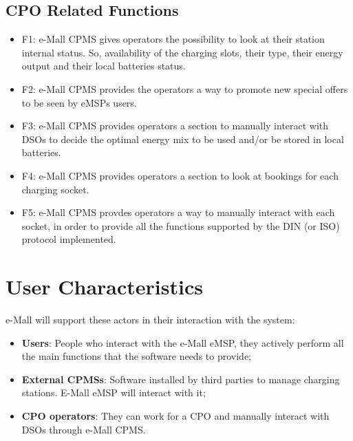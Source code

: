 \documentclass[12pt]{report}
\begin{document}
\subsection{CPO Related Functions}
\begin{itemize}
    \item F1: e-Mall CPMS gives operators the possibility to look at their station internal status. So, availability of the charging slots, their type, their energy output and their local batteries status.
    \item F2: e-Mall CPMS provides the operators a way to promote new special offers to be seen by eMSPs users.
    \item F3: e-Mall CPMS provides operators a section to manually interact with DSOs to decide the optimal energy mix to be used and/or be stored in local batteries.
    \item F4: e-Mall CPMS provides operators a section to look at bookings for each charging socket.
    \item F5: e-Mall CPMS provdes operators a way to manually interact with each socket, in order to provide all the functions supported by the DIN (or ISO) protocol implemented.
\end{itemize}

\section{User Characteristics}
e-Mall will support these actors in their interaction with the system:
\begin{itemize}
    \item\textbf{Users}: People who interact with the e-Mall eMSP, they actively perform all the main functions that the software needs to provide;
    \item\textbf{External CPMSs}: Software installed by third parties to manage charging stations. E-Mall eMSP will interact with it;
    \item\textbf{CPO operators}: They can work for a CPO and manually interact with DSOs through e-Mall CPMS.
\end{itemize}
\end{document}
